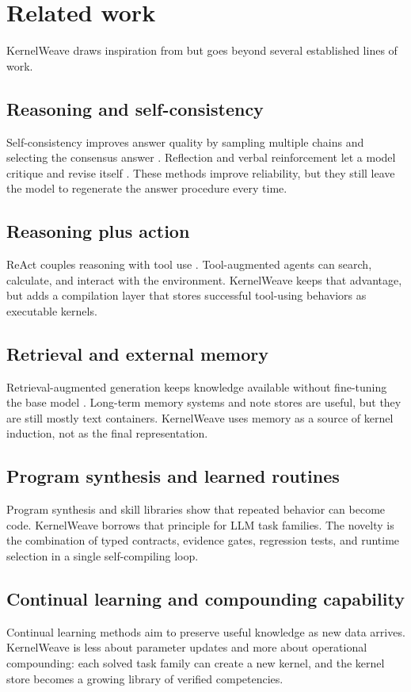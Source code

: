 \documentclass{article}
\begin{document}
\section{Related work}

KernelWeave draws inspiration from but goes beyond several established lines of work.

\subsection{Reasoning and self-consistency}
Self-consistency improves answer quality by sampling multiple chains and selecting the consensus answer \cite{wang2023selfconsistency}. Reflection and verbal reinforcement let a model critique and revise itself \cite{shinn2023reflexion}. These methods improve reliability, but they still leave the model to regenerate the answer procedure every time.

\subsection{Reasoning plus action}
ReAct couples reasoning with tool use \cite{yao2023react}. Tool-augmented agents can search, calculate, and interact with the environment. KernelWeave keeps that advantage, but adds a compilation layer that stores successful tool-using behaviors as executable kernels.

\subsection{Retrieval and external memory}
Retrieval-augmented generation keeps knowledge available without fine-tuning the base model \cite{lewis2020retrieval}. Long-term memory systems and note stores are useful, but they are still mostly text containers. KernelWeave uses memory as a source of kernel induction, not as the final representation.

\subsection{Program synthesis and learned routines}
Program synthesis and skill libraries show that repeated behavior can become code. KernelWeave borrows that principle for LLM task families. The novelty is the combination of typed contracts, evidence gates, regression tests, and runtime selection in a single self-compiling loop.

\subsection{Continual learning and compounding capability}
Continual learning methods aim to preserve useful knowledge as new data arrives. KernelWeave is less about parameter updates and more about operational compounding: each solved task family can create a new kernel, and the kernel store becomes a growing library of verified competencies.
\end{document}
